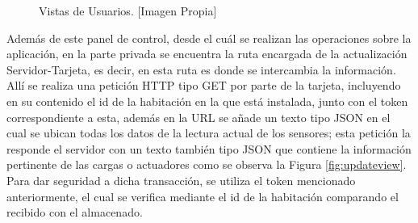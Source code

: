 \begin{figure}[p]
	\centering
	\caption[Vistas de Usuarios.]{Vistas de Usuarios. [Imagen Propia]}
	\label{fig:views}
\end{figure}

Además de este panel de control, desde el cuál se realizan las operaciones sobre la aplicación, en la parte privada se encuentra la ruta encargada de la actualización Servidor-Tarjeta, es decir, en esta ruta es donde se intercambia la información. Allí se realiza una petición HTTP tipo GET por parte de la tarjeta, incluyendo en su contenido el id de la habitación en la que está instalada, junto con el token correspondiente a esta, además en la URL se añade un texto tipo JSON en el cual se ubican todas los datos de la lectura actual de los sensores; esta petición la responde el servidor con un texto también tipo JSON que contiene la información pertinente de las cargas o actuadores como se observa la Figura \ref{fig:updateview}. Para dar seguridad a dicha transacción, se utiliza el token mencionado anteriormente, el cual se verifica mediante el id de la habitación comparando el recibido con el almacenado.\\

